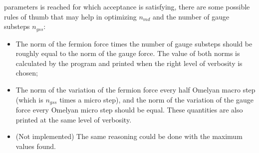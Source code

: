 parameters is 
reached for which acceptance is satisfying, there are some possible rules of 
thumb that 
may help in optimizing $n_{md}$ and the number of gauge substeps $n_{gss}$:
\begin{itemize}
    \item The norm of the fermion force times the number of gauge substeps should 
        be 
        roughly equal to the norm of the gauge force. The value of both norms is 
        calculated by 
        the program and printed when the right level of verbosity is chosen;
    \item The norm of the variation of the fermion force every half Omelyan macro 
        step 
        (which is $n_{gss}$ times a micro step), and the norm of the variation of the 
        gauge 
        force every Omelyan micro step should be equal. These quantities are also 
        printed at 
        the same level of verbosity.
    \item (Not implemented) The same reasoning could be done with the maximum values 
        found.
\end{itemize}









